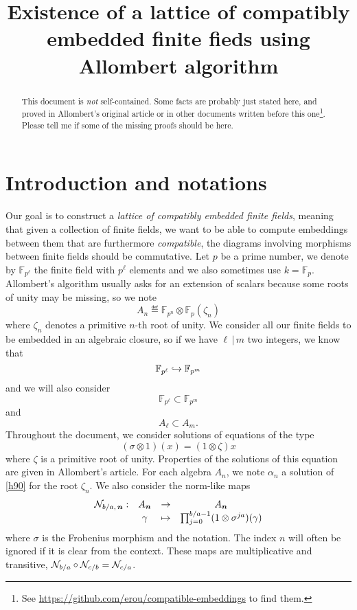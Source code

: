 \documentclass[a4paper,11pt]{article}
\title{Existence of a lattice of compatibly embedded finite fieds using
Allombert algorithm}
\author{}
\begin{document}
\maketitle

\begin{abstract}
  This document is \emph{not} self-contained. Some facts are probably just
  stated here, and proved in Allombert's original article or in other documents
  written before this one\footnote{See
    \url{https://github.com/erou/compatible-embeddings} to find them.}. Please
    tell me if some of the missing proofs should be here.
\end{abstract}



\section{Introduction and notations}
\label{sec:intro}

Our goal is to construct a \emph{lattice of compatibly embedded finite fields},
meaning that given a collection of finite fields, we want to be able to compute
embeddings between them that are furthermore \emph{compatible}, \ie the diagrams
involving morphisms between finite fields should be commutative. Let $p$ be a
prime number, we denote by $\mathbb{F}_{p^{\ell}}$ the finite field with
$p^\ell$ elements and we also sometimes use $k=\mathbb{F}_p$. Allombert's algorithm usually asks for an extension of
scalars because some roots of unity may be missing, so we note 
\[
  A_n \eqdef \mathbb{F}_{p^n}\otimes\mathbb{F}_{p}(\zeta_n)
\]
where $\zeta_n$ denotes a primitive $n$-th root of unity. We consider all our finite
fields to be embedded in an algebraic closure, so if we have $\ell\,|\,m$ two
integers, we know that
\[
  \mathbb{F}_{p^{\ell}}\hookrightarrow\mathbb{F}_{p^m}
\]
and we will also consider 
\[
  \mathbb{F}_{p^{\ell}}\subset\mathbb{F}_{p^m}
\]
and
\[
  A_{\ell}\subset A_m.
\]
Throughout the document, we consider solutions of equations of the type
\begin{equation}
  \tag{H90}
 (\sigma\otimes1)(x) = (1\otimes\zeta)x
  \label{h90}
\end{equation}
where $\zeta$ is a primitive root of unity. Properties of the solutions of this
equation are given in Allombert's article. For each algebra $A_n$, we note
$\alpha_n$ a solution of \eqref{h90} for the root $\zeta_n$. We also consider
the norm-like maps
\[
\begin{array}{cccc}
  \mathcal N_{b/a,\, \bm{n}}: & A_{\bm{n}} & \to &
  A_{\bm{n}} \\
  & \gamma & \mapsto & \prod_{j=0}^{b/a-1} (1 \otimes
  \sigma^{ja})(\gamma)
\end{array}
\]
where $\sigma$ is the Frobenius morphism and the notation. The index $n$ will often be
ignored if it is clear from the context. These maps are multiplicative and
transitive, \ie $\mathcal N_{b/a}\circ \mathcal N_{c/b} = \mathcal N_{c/a}$.
\end{document}
